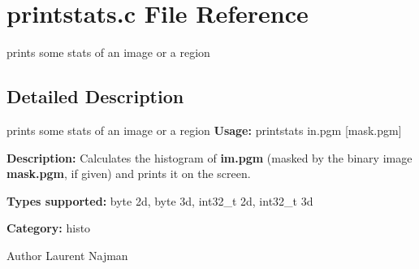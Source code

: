 \section{printstats.c File Reference}
\label{printstats_8c}


prints some stats of an image or a region  




\subsection{Detailed Description}
prints some stats of an image or a region {\bfseries Usage:} printstats in.pgm [mask.pgm]

{\bfseries Description:} Calculates the histogram of {\bfseries im.pgm} (masked by the binary image {\bfseries mask.pgm}, if given) and prints it on the screen.

{\bfseries Types supported:} byte 2d, byte 3d, int32\_\-t 2d, int32\_\-t 3d

{\bfseries Category:} histo

\begin{DoxyAuthor}{Author}
Laurent Najman 
\end{DoxyAuthor}
